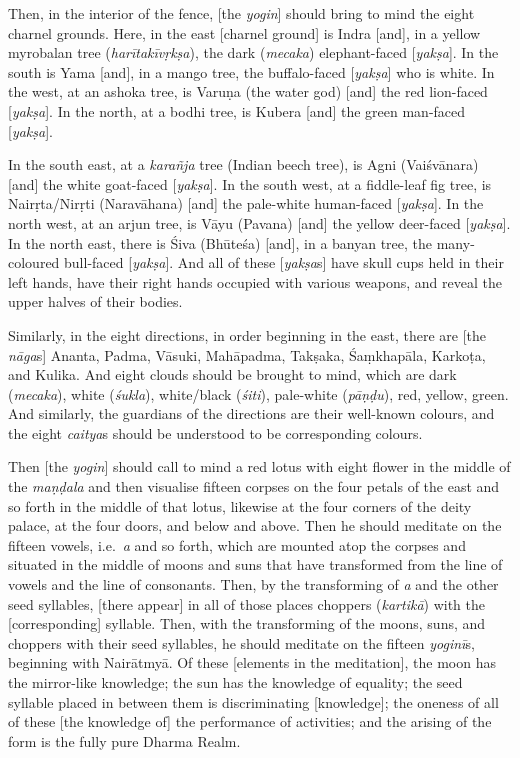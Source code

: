 \documentclass[naipra.tex]{subfiles}
\begin{document}
Then, in the interior of the fence, [the \emph{yogin}] should bring to mind the eight charnel grounds.
Here, in the east [charnel ground] is Indra [and], in a yellow myrobalan tree (\emph{harītakīvṛkṣa}), the dark (\emph{mecaka}) elephant-faced [\emph{yakṣa}].
In the south is Yama [and], in a mango tree, the buffalo-faced [\emph{yakṣa}] who is white.
In the west, at an ashoka tree, is Varuṇa (the water god) [and] the red lion-faced [\emph{yakṣa}].
In the north, at a bodhi tree, is Kubera [and] the green %
man-faced [\emph{yakṣa}]. 

In the south east, at a \emph{karañja} tree (Indian beech tree), is Agni (Vaiśvānara) [and] the white goat-faced [\emph{yakṣa}]. %
In the south west, at a fiddle-leaf fig tree, is Nairṛta/Nirṛti (Naravāhana) [and] the pale-white human-faced [\emph{yakṣa}]. %
In the north west, at an arjun tree, is Vāyu (Pavana) [and] the yellow deer-faced [\emph{yakṣa}]. %
In the north east, there is Śiva (Bhūteśa) [and], in a banyan tree, the many-coloured bull-faced [\emph{yakṣa}]. %
And all of these [\emph{yakṣa}s] have skull cups held in their left hands, have their right hands occupied with various weapons, and reveal the upper halves of their bodies.

Similarly, in the eight directions, in order beginning in the east, there are [the \emph{nāga}s] Ananta, Padma, Vāsuki, Mahāpadma, Takṣaka, Śaṃkhapāla, Karkoṭa, and Kulika.
And eight clouds should be brought to mind, which are dark (\emph{mecaka}), white (\emph{śukla}), white/black (\emph{śiti}), pale-white (\emph{pāṇḍu}), red, yellow, green. 
And similarly, the guardians of the directions are their well-known colours, and the eight \emph{caitya}s should be understood to be corresponding colours. 

Then [the \emph{yogin}] should call to mind a red lotus with eight flower in the middle of the \emph{maṇḍala} and then visualise fifteen corpses on the four petals of the east and so forth in the middle of that lotus, likewise at the four corners of the deity palace, at the four doors, and below and above.
Then he should meditate on the fifteen vowels, i.e.\ \emph{a} and so forth, which are mounted atop the corpses and situated in the middle of moons and suns that have transformed from the line of vowels and the line of consonants.
Then, by the transforming of \emph{a} and the other seed syllables, [there appear] in all of those places choppers (\emph{kartikā}) with the [corresponding] syllable.
Then, with the transforming of the moons, suns, and choppers with their seed syllables, he should meditate on the fifteen \emph{yoginī}s, beginning with Nairātmyā.
Of these [elements in the meditation], the moon has the mirror-like knowledge; the sun has the knowledge of equality; the seed syllable placed in between them is discriminating [knowledge]; the oneness of all of these [the knowledge of] the performance of activities; and the arising of the form is the fully pure Dharma Realm.
\end{document}
